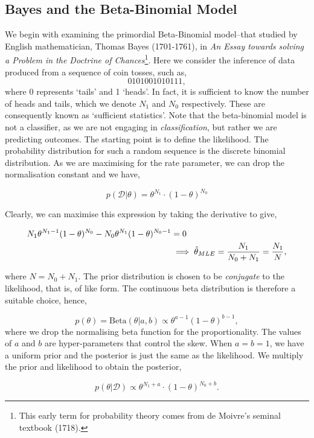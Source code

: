 \documentclass[11pt]{amsart}
\begin{document}
\subsection{Bayes and the Beta-Binomial Model}

We begin with examining the primordial Beta-Binomial model--that studied by English mathematician, Thomas Bayes (1701-1761), in \emph{An Essay towards solving a Problem in the Doctrine of Chances}\footnote{This early term for probability theory comes from de Moivre's seminal textbook (1718).}. Here we consider the inference of data produced from a sequence of coin tosses, such as, $$0101001010111,$$ where $0$ represents `tails' and 1 `heads'. In fact, it is sufficient to know the number of heads and tails, which we denote $N_1$ and $N_0$ respectively. These are consequently known as `sufficient statistics'. Note that the beta-binomial model is not a classifier, as we are not engaging in \emph{classification}, but rather we are predicting outcomes. The starting point is to define the likelihood. The probability distribution for such a random sequence is the discrete binomial distribution. As we are maximising for the rate parameter, we can drop the normalisation constant and we have,

$$p(\mathcal{D}|\theta) = \theta^{N_1}\cdot(1 - \theta)^{N_0}$$

Clearly, we can maximise this expression by taking the derivative to give,

\begin{align}
N_1\theta^{N_1 - 1}(1 - \theta)^{N_0} - N_0\theta^{N_1}(1 - \theta)^{N_0 - 1} &= 0 \notag \\
&\implies \hat\theta_{MLE} = \frac{N_1}{N_0 + N_1} = \frac{N_1}{N}, \notag
\end{align}

where $N = N_0 + N_1$. The prior distribution is chosen to be \emph{conjugate} to the likelihood, that is, of like form. The continuous beta distribution is therefore a suitable choice, hence,

$$p(\theta) = \text{Beta}(\theta|a, b) \propto \theta^{a - 1}(1 - \theta)^{b - 1},$$ where we drop the normalising beta function for the proportionality. The values of $a$ and $b$ are hyper-parameters that control the skew. When $a = b = 1$, we have a uniform prior and the posterior is just the same as the likelihood. We multiply the prior and likelihood to obtain the posterior,

$$p(\theta|\mathcal{D}) \propto \theta^{N_1 + a}\cdot(1 - \theta)^{N_0 + b}.$$
\end{document}
